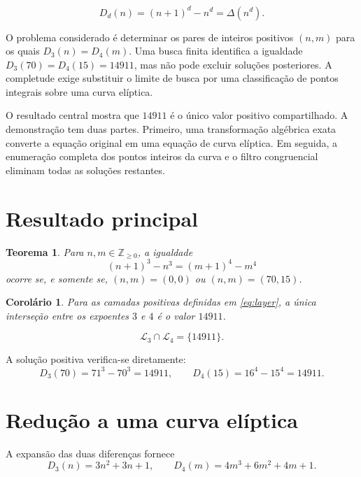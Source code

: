 \documentclass[11pt,letterpaper]{article}
\newtheorem{theorem}{Teorema}
\newtheorem{corollary}{Corolário}
\theoremstyle{definition}
\newcommand{\Dd}[2]{D_{#1}\!\left(#2\right)}
\newcommand{\Layer}[1]{\mathcal{L}_{#1}}
\begin{document}
\begin{equation}
  \Dd{d}{n}=(n+1)^d-n^d=\Delta(n^d).
  \label{eq:forward}
\end{equation}

O problema considerado é determinar os pares de inteiros positivos \((n,m)\) para os quais
\(\Dd{3}{n}=\Dd{4}{m}\).
Uma busca finita identifica a igualdade
\(\Dd{3}{70}=\Dd{4}{15}=14911\),
mas não pode excluir soluções posteriores. A completude exige substituir o limite de busca por uma classificação de pontos integrais sobre uma curva elíptica.

O resultado central mostra que \(14911\) é o único valor positivo compartilhado. A demonstração tem duas partes. Primeiro, uma transformação algébrica exata converte a equação original em uma equação de curva elíptica. Em seguida, a enumeração completa dos pontos inteiros da curva e o filtro congruencial eliminam todas as soluções restantes.

\section{Resultado principal}

\begin{theorem}
Para \(n,m\in\mathbb{Z}_{\geq0}\), a igualdade
\[
  (n+1)^3-n^3=(m+1)^4-m^4
\]
ocorre se, e somente se,
\((n,m)=(0,0)\) ou \((n,m)=(70,15)\).
\end{theorem}

\begin{corollary}
Para as camadas positivas definidas em \eqref{eq:layer}, a única interseção entre os expoentes \(3\) e \(4\) é o valor \(14911\).
\end{corollary}

\begin{equation}
  \Layer{3}\cap\Layer{4}=\{14911\}.
  \label{eq:intersection}
\end{equation}

A solução positiva verifica-se diretamente:
\[
  \Dd{3}{70}=71^3-70^3=14911,
  \qquad
  \Dd{4}{15}=16^4-15^4=14911.
\]

\section{Redução a uma curva elíptica}

A expansão das duas diferenças fornece
\begin{equation}
  \Dd{3}{n}=3n^2+3n+1,
  \qquad
  \Dd{4}{m}=4m^3+6m^2+4m+1.
  \label{eq:expansion}
\end{equation}
\end{document}
